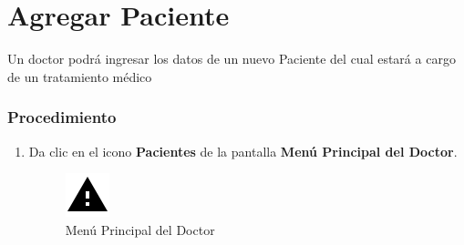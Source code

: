 \section{Agregar Paciente}

Un doctor podrá ingresar los datos de un nuevo Paciente del cual
estará a cargo de un tratamiento médico 

\subsubsection{Procedimiento}
\begin{enumerate}
	
	\item Da clic en el icono \textbf{Pacientes} de la pantalla \textbf{Menú Principal del Doctor}.

		\begin{figure}[!htbp]			\hypertarget{fig:mpDoctor4}{\hspace{1pt}}
		\begin{center}
			\includegraphics[height=0.4\textheight]{images/Iconos/Advertencia}
			\caption{Menú Principal del Doctor}
			\label{fig:mpDoctor4}
		\end{center}
	\end{figure}


\end{enumerate}
